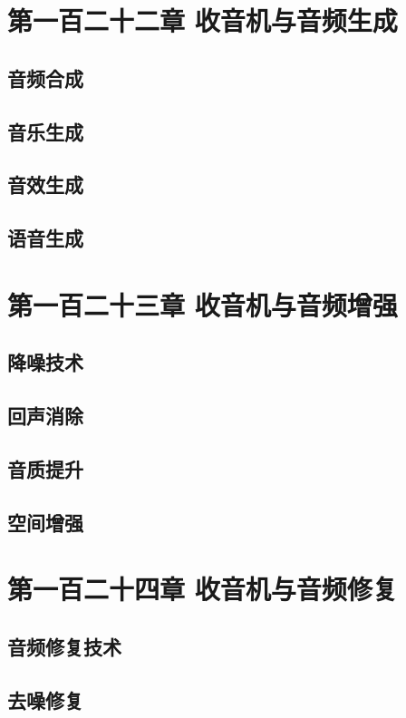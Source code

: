 \documentclass[12pt,UTF8]{ctexbook}
\begin{document}
\chapter{第一百二十二章 收音机与音频生成}

\section{音频合成}
\section{音乐生成}
\section{音效生成}
\section{语音生成}

\chapter{第一百二十三章 收音机与音频增强}

\section{降噪技术}
\section{回声消除}
\section{音质提升}
\section{空间增强}

\chapter{第一百二十四章 收音机与音频修复}

\section{音频修复技术}
\section{去噪修复}
\end{document}
